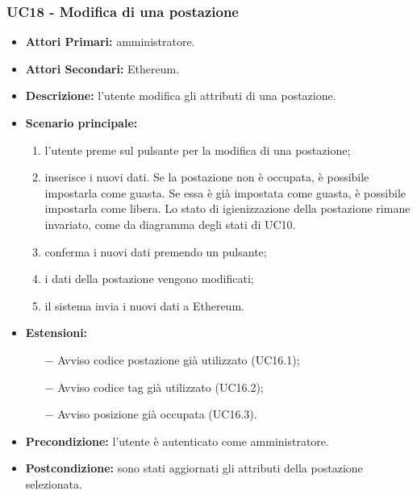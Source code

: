 \subsubsection{ UC18 - Modifica di una postazione}
\begin{itemize}
	\item\textbf{Attori Primari:}
	amministratore.
	\item\textbf{Attori Secondari:}
	Ethereum.
	\item\textbf{Descrizione:}
	l'utente modifica gli attributi di una postazione.
	\item\textbf{Scenario principale:} 
	\begin{enumerate}
		\item l'utente preme sul pulsante per la modifica di una postazione;
		\item inserisce i nuovi dati. Se la postazione non è occupata, è possibile impostarla come guasta. Se essa è già impostata come guasta, è possibile impostarla come libera. Lo stato di igienizzazione della postazione rimane invariato, come da diagramma degli stati di UC10.
		\item conferma i nuovi dati premendo un pulsante;
		\item i dati della postazione vengono modificati;
		\item il sistema invia i nuovi dati a Ethereum.
	\end{enumerate}
	\item\textbf{Estensioni:}
	\begin{itemize}
		\item[$-$] Avviso codice postazione già utilizzato (UC16.1);
		\item[$-$] Avviso codice tag già utilizzato (UC16.2);
		\item[$-$] Avviso posizione già occupata (UC16.3).
	\end{itemize}
	\item\textbf{Precondizione:} 
	l'utente è autenticato come amministratore.
	\item\textbf{Postcondizione:}
	sono stati aggiornati gli attributi della postazione selezionata.
\end{itemize}


